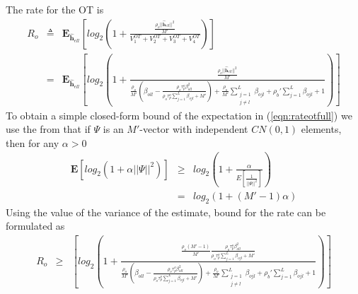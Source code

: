 \documentclass[10pt, a4paper, twoside,fleqn]{article}
\begin{document}
The rate for the OT is
\begin{eqnarray}\label{eqn:rateotfull}
	R_o &\triangleq& \pmb{E}_{\pmb{\hat h}_{ell}}\left[log_2\left(1+\frac{\frac{\rho_o||\pmb{\hat h}_{ell}||^2}{M'}}{V_1^{OT}+V_2^{OT}+V_3^{OT}+V_4^{OT}}\right) \right] \nonumber \\
            &=&  \pmb{E}_{\pmb{\hat h}_{ell}}\left[log_2\left(1+\frac{\frac{\rho_o||\pmb{\hat h}_{ell}||^2}{M'}}
								 {\frac{\rho_o}{M'}(\beta_{oll}-\frac{\rho_o\tau_p^o\beta^2_{oll}}{\rho_o\tau_p^o\sum\limits_{j=1}^{L}\beta_{ojl}+M'})        
								  + \frac{\rho_o}{M'} \sum\limits_{\substack{j=1 \\ j\neq l}}^{L} \beta_{ojl} 
								  +\rho_b'\sum\limits_{j=1}^{L}\beta_{ojl}
								  +1}\right) \right]	
\end{eqnarray}
To obtain a simple closed-form bound of the expectation in (\ref{eqn:rateotfull}) we use the from \cite{bib:dtsysBook} that if $\Psi$ is an $M'$-vector with independent $CN(0,1)$ elements, then for any $\alpha>0$
\begin{eqnarray}\label{eqn:bound}
	\pmb{E}[log_2(1+\alpha||\Psi||^2)] &\geq& log_2\left(1+\frac{\alpha}{E[\frac{1}{||\Psi||^2}]}\right) \nonumber \\
                                              &=&  log_2(1+(M'-1)\alpha)
\end{eqnarray}
Using the value of the variance of the estimate, bound for the rate can be formulated as
\begin{eqnarray}
	R_o &\geq& \left[log_2\left(1+\frac{\frac{\rho_o(M'-1)}{M'}\frac{\rho_o\tau_p^o\beta^2_{oll}}{\rho_o\tau_p^o\sum\limits_{j=1}^{L}\beta_{ojl}+M'}}
								 {\frac{\rho_o}{M'}(\beta_{oll}-\frac{\rho_o\tau_p^o\beta^2_{oll}}{\rho_o\tau_p^o\sum\limits_{j=1}^{L}\beta_{ojl}+M'})        
								  + \frac{\rho_o}{M'} \sum\limits_{\substack{j=1 \\ j\neq l}}^{L} \beta_{ojl} 
								  +\rho_b'\sum\limits_{j=1}^{L}\beta_{ojl}
								  +1}\right) \right]	
\end{eqnarray}
\end{document}
